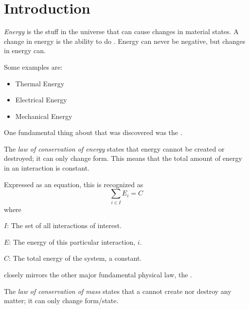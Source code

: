 \section{Introduction}\label{sec:Introduction}
\begin{definition}[Energy]\label{def:Energy}
  \emph{Energy} is the stuff in the universe that can cause changes in material states.
  A change in energy is the ability to do .
  Energy can never be negative, but changes in energy can.

  Some examples are:
  \begin{itemize}[noitemsep]
  \item Thermal Energy
  \item Electrical Energy
  \item Mechanical Energy
  \end{itemize}
\end{definition}

One fundamental thing about  that was discovered was the .
\begin{definition}\label{def:Law_Conservation_Energy}
  The \emph{law of conservation of energy} states that energy cannot be created or destroyed; it can only change form.
  This means that the total amount of energy in an interaction is constant.

  Expressed as an equation, this is recognized as
  \begin{equation}\label{eq:Law_Conservation_Energy}
    \sum_{i \in I} E_{i} = C
  \end{equation}
  where
  \begin{description}[noitemsep]
  \item $I$: The set of all interactions of interest.
  \item $E$: The energy of this particular interaction, $i$.
  \item $C$: The total energy of the system, a constant.
  \end{description}
\end{definition}

 closely mirrors the other major fundamental physical law, the .

\begin{definition}\label{def:Law_Conservation_Mass}
  The \emph{law of conservation of mass} states that a  cannot create nor destroy any matter; it can only change form/state.
\end{definition}

